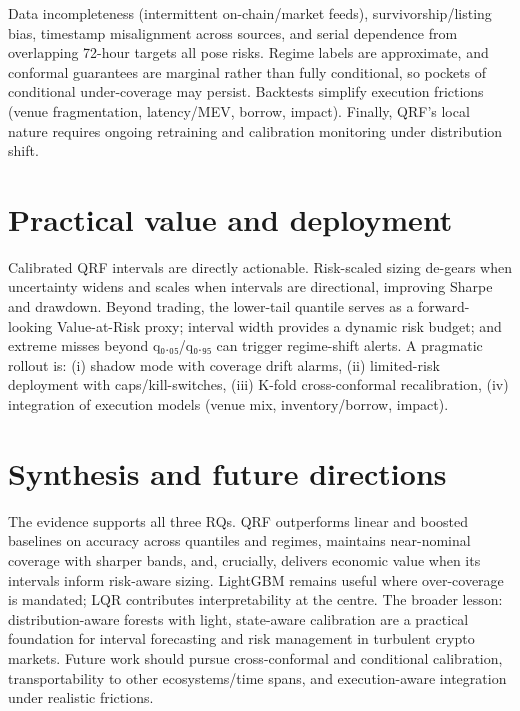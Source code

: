 \documentclass[
  a4paper,
  DIV=11,
  numbers=noendperiod]{scrreprt}
\begin{document}
Data incompleteness (intermittent on-chain/market feeds),
survivorship/listing bias, timestamp misalignment across sources, and
serial dependence from overlapping 72-hour targets all pose risks.
Regime labels are approximate, and conformal guarantees are marginal
rather than fully conditional, so pockets of conditional under-coverage
may persist. Backtests simplify execution frictions (venue
fragmentation, latency/MEV, borrow, impact). Finally, QRF's local nature
requires ongoing retraining and calibration monitoring under
distribution shift.

\section{Practical value and
deployment}\label{practical-value-and-deployment}

Calibrated QRF intervals are directly actionable. Risk-scaled sizing
de-gears when uncertainty widens and scales when intervals are
directional, improving Sharpe and drawdown. Beyond trading, the
lower-tail quantile serves as a forward-looking Value-at-Risk proxy;
interval width provides a dynamic risk budget; and extreme misses beyond
q₀.₀₅/q₀.₉₅ can trigger regime-shift alerts. A pragmatic rollout is: (i)
shadow mode with coverage drift alarms, (ii) limited-risk deployment
with caps/kill-switches, (iii) K-fold cross-conformal recalibration,
(iv) integration of execution models (venue mix, inventory/borrow,
impact).

\section{Synthesis and future
directions}\label{synthesis-and-future-directions}

The evidence supports all three RQs. QRF outperforms linear and boosted
baselines on accuracy across quantiles and regimes, maintains
near-nominal coverage with sharper bands, and, crucially, delivers
economic value when its intervals inform risk-aware sizing. LightGBM
remains useful where over-coverage is mandated; LQR contributes
interpretability at the centre. The broader lesson: distribution-aware
forests with light, state-aware calibration are a practical foundation
for interval forecasting and risk management in turbulent crypto
markets. Future work should pursue cross-conformal and conditional
calibration, transportability to other ecosystems/time spans, and
execution-aware integration under realistic frictions.

\end{document}
